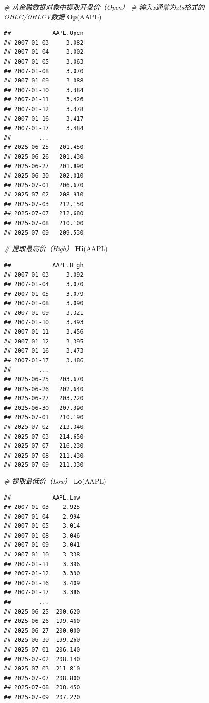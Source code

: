 \documentclass[]{ctexbook}
\newenvironment{Shaded}{\begin{snugshade}}{\end{snugshade}}
\newcommand{\CommentTok}[1]{\textcolor[rgb]{0.56,0.35,0.01}{\textit{#1}}}
\newcommand{\FunctionTok}[1]{\textcolor[rgb]{0.13,0.29,0.53}{\textbf{#1}}}
\newcommand{\NormalTok}[1]{#1}
\begin{document}
\begin{Shaded}
\begin{Highlighting}[]
\CommentTok{\# 从金融数据对象中提取开盘价（Open）}
\CommentTok{\# 输入x通常为xts格式的OHLC/OHLCV数据}
\FunctionTok{Op}\NormalTok{(AAPL)}
\end{Highlighting}
\end{Shaded}

\begin{verbatim}
##            AAPL.Open
## 2007-01-03     3.082
## 2007-01-04     3.002
## 2007-01-05     3.063
## 2007-01-08     3.070
## 2007-01-09     3.088
## 2007-01-10     3.384
## 2007-01-11     3.426
## 2007-01-12     3.378
## 2007-01-16     3.417
## 2007-01-17     3.484
##        ...          
## 2025-06-25   201.450
## 2025-06-26   201.430
## 2025-06-27   201.890
## 2025-06-30   202.010
## 2025-07-01   206.670
## 2025-07-02   208.910
## 2025-07-03   212.150
## 2025-07-07   212.680
## 2025-07-08   210.100
## 2025-07-09   209.530
\end{verbatim}

\begin{Shaded}
\begin{Highlighting}[]
\CommentTok{\# 提取最高价（High）}
\FunctionTok{Hi}\NormalTok{(AAPL)}
\end{Highlighting}
\end{Shaded}

\begin{verbatim}
##            AAPL.High
## 2007-01-03     3.092
## 2007-01-04     3.070
## 2007-01-05     3.079
## 2007-01-08     3.090
## 2007-01-09     3.321
## 2007-01-10     3.493
## 2007-01-11     3.456
## 2007-01-12     3.395
## 2007-01-16     3.473
## 2007-01-17     3.486
##        ...          
## 2025-06-25   203.670
## 2025-06-26   202.640
## 2025-06-27   203.220
## 2025-06-30   207.390
## 2025-07-01   210.190
## 2025-07-02   213.340
## 2025-07-03   214.650
## 2025-07-07   216.230
## 2025-07-08   211.430
## 2025-07-09   211.330
\end{verbatim}

\begin{Shaded}
\begin{Highlighting}[]
\CommentTok{\# 提取最低价（Low）}
\FunctionTok{Lo}\NormalTok{(AAPL)}
\end{Highlighting}
\end{Shaded}

\begin{verbatim}
##            AAPL.Low
## 2007-01-03    2.925
## 2007-01-04    2.994
## 2007-01-05    3.014
## 2007-01-08    3.046
## 2007-01-09    3.041
## 2007-01-10    3.338
## 2007-01-11    3.396
## 2007-01-12    3.330
## 2007-01-16    3.409
## 2007-01-17    3.386
##        ...         
## 2025-06-25  200.620
## 2025-06-26  199.460
## 2025-06-27  200.000
## 2025-06-30  199.260
## 2025-07-01  206.140
## 2025-07-02  208.140
## 2025-07-03  211.810
## 2025-07-07  208.800
## 2025-07-08  208.450
## 2025-07-09  207.220
\end{verbatim}
\end{document}
